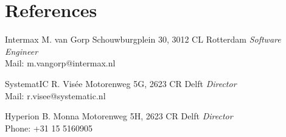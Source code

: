 \documentclass[]{friggeri-cv}
\begin{document}
\section{References}

\begin{entrylist}

\entry
{Intermax}
{M. van Gorp}
{Schouwburgplein 30, 3012 CL Rotterdam }
{\emph{Software Engineer} \\
Mail: m.vangorp@intermax.nl}

\entry
{SystematIC}
{R. Visée}
{Motorenweg 5G, 2623 CR Delft}
{\emph{Director} \\
Mail: r.visee@systematic.nl}

\entry
{Hyperion}
{B. Monna}
{Motorenweg 5H, 2623 CR Delft}
{\emph{Director} \\
Phone: +31 15 5160905}

\end{entrylist}

\end{document}
